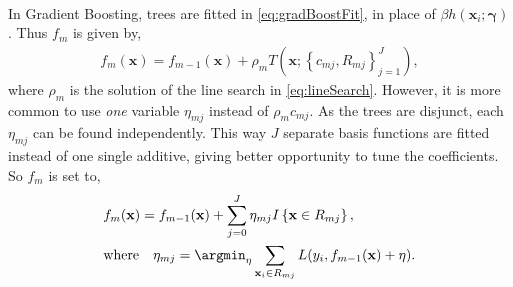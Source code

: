 \\
In Gradient Boosting, trees are fitted in \eqref{eq:gradBoostFit}, in place of $\beta h(\mathbf{x}_i; \bm{\gamma})$. Thus $f_m$ is given by, 
\begin{align}
  f_m(\mathbf{x}) = f_{m-1}(\mathbf{x}) + \rho_m T(\mathbf{x}; \left\{ c_{m j}, R_{m j} \right\}_{j=1}^{J}),
\end{align}
where $\rho_m$ is the solution of the line search in \eqref{eq:lineSearch}.  However, it is more common to use \textit{one} variable $\eta_{m j}$ instead of $\rho_m c_{m j}$. 
As the trees are disjunct, each $\eta_{m j}$ can be found independently.
This way $J$ separate basis functions are fitted instead of one single additive, giving better opportunity to tune the coefficients. So $f_m$ is set to,
\begin{align}
  &f_m(\mathbf{x}) = f_{m-1}(\mathbf{x}) +  \sum^{J}_{j=0} \eta_{m j} I\left\{ \mathbf{x} \in R_{m j} \right\}, \\
  \label{eq:etaLineSearch} 
  &\text{where} \quad
  \eta_{m j} = \argmin_\eta  \sum_{\mathbf{x}_i \in R_{m j}} L(y_i, f_{m-1}(\mathbf{x}) + \eta).
\end{align}


